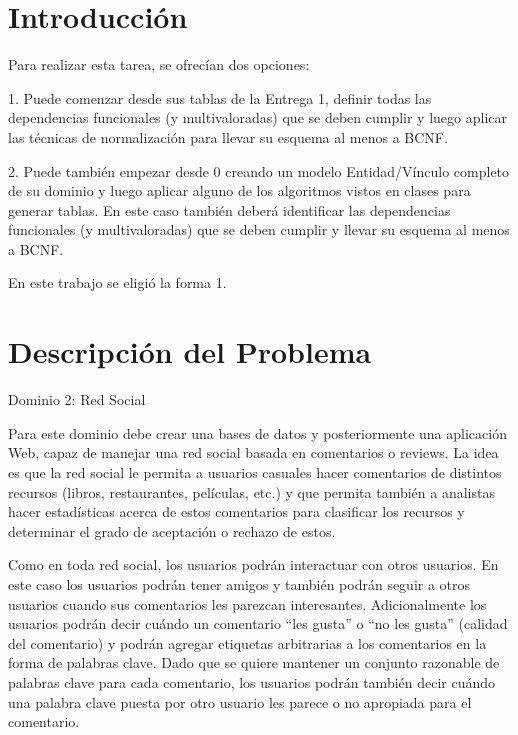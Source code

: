 \documentclass[12pt,letterpaper]{article}
\begin{document}

\newpage
\pagestyle{fancy}
\headheight=60pt 					
\fancyhead[R]
{}
\setcounter{page}{1}
\tableofcontents

\newpage

\section{Introducción}
Para realizar esta tarea, se ofrecían dos opciones:

1. Puede comenzar desde sus tablas de la Entrega 1, definir todas las dependencias funcionales (y multivaloradas) que se deben cumplir y luego aplicar las técnicas de normalización para llevar su esquema al menos a BCNF.

2. Puede también empezar desde 0 creando un modelo Entidad/Vínculo completo de su dominio y luego aplicar alguno de los algoritmos vistos en clases para generar tablas. En este caso también deberá identificar las dependencias funcionales (y multivaloradas) que se deben cumplir y llevar su esquema al menos a BCNF.

En este trabajo se eligió la forma 1.

\section{Descripción del Problema}
Dominio 2: Red Social

Para este dominio debe crear una bases de datos y posteriormente una aplicación Web, capaz de manejar una red social basada en comentarios o reviews. La idea es que la red social le permita a usuarios casuales hacer comentarios de distintos recursos (libros, restaurantes, películas, etc.) y que permita también a analistas hacer estadísticas acerca de estos comentarios para clasificar los recursos y determinar el grado de aceptación o rechazo de estos.

Como en toda red social, los usuarios podrán interactuar con otros usuarios. En este caso los usuarios podrán tener amigos y también podrán seguir a otros usuarios cuando sus comentarios les parezcan interesantes. Adicionalmente los usuarios podrán decir cuándo un comentario ``les gusta'' o ``no les gusta'' (calidad del comentario) y podrán agregar etiquetas arbitrarias a los comentarios en la forma de palabras clave. Dado que se quiere mantener un conjunto razonable de palabras clave para cada comentario, los usuarios podrán también decir cuándo una palabra clave puesta por otro usuario les parece o no apropiada para el comentario.
\end{document}
